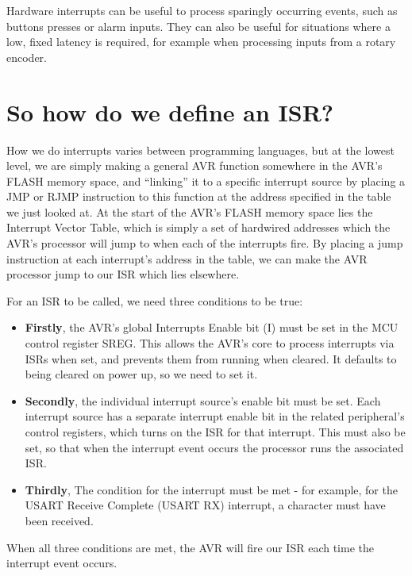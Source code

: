\documentclass[a4paper,oneside,notitlepage]{book}
\begin{document}
Hardware interrupts can be useful to process sparingly occurring events, such as buttons presses or alarm inputs. They can also be useful for situations where a low, fixed latency is required, for example when processing inputs from a rotary encoder.


\chapter{So how do we define an ISR?}
\label{chp:DefISR}

How we do interrupts varies between programming languages, but at the lowest level, we are simply making a general AVR function somewhere in the AVR's FLASH memory space, and ``linking'' it to a specific interrupt source by placing a JMP or RJMP instruction to this function at the address specified in the table we just looked at. At the start of the AVR's FLASH memory space lies the Interrupt Vector Table, which is simply a set of hardwired addresses which the AVR's processor will jump to when each of the interrupts fire. By placing a jump instruction at each interrupt's address in the table, we can make the AVR processor jump to our ISR which lies elsewhere.

For an ISR to be called, we need three conditions to be true:

\begin{itemize}
\item \textbf{Firstly}, the AVR's global Interrupts Enable bit (I) must be set in the MCU control register SREG. This allows the AVR's core to process interrupts via ISRs when set, and prevents them from running when cleared. It defaults to being cleared on power up, so we need to set it.

\item \textbf{Secondly}, the individual interrupt source's enable bit must be set. Each interrupt source has a separate interrupt enable bit in the related peripheral's control registers, which turns on the ISR for that interrupt. This must also be set, so that when the interrupt event occurs the processor runs the associated ISR.

\item \textbf{Thirdly}, The condition for the interrupt must be met - for example, for the USART Receive Complete (USART RX) interrupt, a character must have been received.
\end{itemize}

When all three conditions are met, the AVR will fire our ISR each time the interrupt event occurs.
\end{document}
